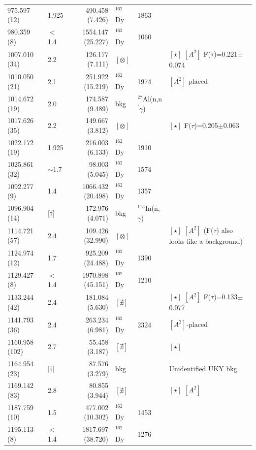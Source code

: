 \begin{landscape}
\begin{center}
\begin{longtable}{p{2.6cm}|p{1.2cm}|r|p{1.1cm}|p{2.0cm}|l}
   975.597 (12)  & 1.925      & 490.458 (7.426)& $^{162}$Dy & 1863 & \\
   980.359 (8)   & $<$1.4     &1554.147 (25.227)& $^{162}$Dy & 1060 & \\
  1007.010 (34)  & 2.2        &126.177 (7.111)& $[\otimes]$ & &$[\star]$ $[A^2]$ F($\tau$)=0.221$\pm$0.074\\
  1010.050 (21)  & 2.1        &251.922 (15.219)& $^{162}$Dy & 1974 &$[A^2]$-placed \\
  1014.672 (19)  & 2.0        &174.587 (9.489)& bkg & $^{27}$Al(n,n$^\prime\gamma$) &  \\
  1017.626 (35)  & 2.2        &149.667 (3.812)& $[\otimes]$ & &$[\star]$ F($\tau$)=0.205$\pm$0.063\\
  1022.172 (19)  & 1.925      &216.003 (6.133)& $^{162}$Dy & 1910 & \\
  1025.861 (32)  & $\sim$1.7  & 98.003 (5.045)& $^{162}$Dy & 1574 & \\
  1092.277 (9)   & 1.4        &1066.432 (20.498)& $^{162}$Dy & 1357 & \\
  1096.904 (14)  & [$\dagger$]  & 172.976 (4.071)& bkg & $^{115}$In(n,$\gamma$) &  \\ %
  1114.721 (57)  & 2.4        &109.426 (32.990)& $[\otimes]$ & &$[\star]$ $[A^2]$ (F($\tau$) also looks like a background) \\
  1124.974 (12)  & 1.7        & 925.209 (24.488)& $^{162}$Dy & 1390 & \\
  1129.427 (8)   & $<$1.4     &1970.898 (45.151)& $^{162}$Dy & 1210 & \\
  1133.244 (42)  & 2.4        & 181.084 (5.630)& $[\nexists]$ & &$[\star]$ $[A^2]$ F($\tau$)=0.133$\pm$0.077\\
  1141.793 (36)  & 2.4        & 263.234 (6.981)& $^{162}$Dy & 2324 &$[A^2]$-placed \\
  1160.958 (102) & 2.7        &  55.458 (3.187)& $[\nexists]$ & &$[\star]$ \\
  1164.954 (23)  & [$\dagger$]  &  87.576 (3.279)& bkg &  & Unidentified UKY bkg \\
  1169.142 (83)  & 2.8        &  80.855 (3.944)& $[\nexists]$        & & $[\star]$ $[A^2]$ \\
  1187.759 (10)  & 1.5        &477.002 (10.302)& $^{162}$Dy & 1453 & \\
  1195.113 (8)   & $<$1.4     &1817.697 (38.720)& $^{162}$Dy & 1276 & \\

\end{longtable}
\end{center}
\end{landscape}
